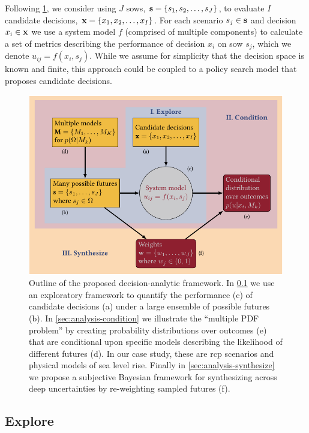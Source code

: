 \documentclass[11pt]{article}
\begin{document}
Following \cref{fig:flowchart}, we consider using $J$ \glspl{sow}, $\vb{s} = \qty{s_1, s_2, \ldots, s_J}$, to evaluate $I$ candidate decisions, $\vb{x} = \qty{x_1, x_2, \ldots, x_I}$.
For each scenario $s_j \in \vb{s}$ and decision $x_i \in \vb{x}$ we use a system model $f$ (comprised of multiple components) to calculate a set of metrics describing the performance of decision $x_i$ on \gls{sow} $s_j$, which we denote $u_{ij} = f(x_i, s_j)$.
While we assume for simplicity that the decision space is known and finite, this approach could be coupled to a policy search model that proposes candidate decisions.

\begin{figure}
    \centering
    \includegraphics[width=\textwidth]{bayes-rdm.pdf}
    \caption{
        Outline of the proposed decision-analytic framework.
        In \cref{sec:analysis-explore} we use an exploratory framework to quantify the performance (c) of candidate decisions (a) under a large ensemble of possible futures (b).
        In \cref{sec:analysis-condition} we illustrate the ``multiple PDF problem'' by creating probability distributions over outcomes (e) that are conditional upon specific models describing the likelihood of different futures (d).
        In our case study, these are \gls{rcp} scenarios and physical models of sea level rise.
        Finally in \cref{sec:analysis-synthesize} we propose a subjective Bayesian framework for synthesizing across deep uncertainties by re-weighting sampled futures (f).
    }\label{fig:flowchart}
\end{figure}

\subsection{Explore}\label{sec:analysis-explore}
\end{document}
